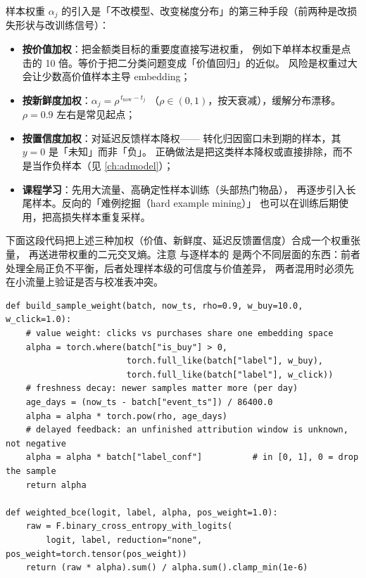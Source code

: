 样本权重 $\alpha_j$ 的引入是「不改模型、改变梯度分布」的第三种手段（前两种是改损失形状与改训练信号）：

\begin{itemize}
  \item \textbf{按价值加权}：把金额类目标的重要度直接写进权重，
        例如下单样本权重是点击的 10 倍。等价于把二分类问题变成「价值回归」的近似。
        风险是权重过大会让少数高价值样本主导 embedding；
  \item \textbf{按新鲜度加权}：$\alpha_j = \rho^{\,t_{\text{now}} - t_j}$
        （$\rho \in (0,1)$，按天衰减），缓解分布漂移。$\rho = 0.9$ 左右是常见起点；
  \item \textbf{按置信度加权}：对延迟反馈样本降权——
        转化归因窗口未到期的样本，其 $y=0$ 是「未知」而非「负」。
        正确做法是把这类样本降权或直接排除，而不是当作负样本（见 \cref{ch:admodel}）；
  \item \textbf{课程学习}：先用大流量、高确定性样本训练（头部热门物品），
        再逐步引入长尾样本。反向的「难例挖掘（hard example mining）」
        也可以在训练后期使用，把高损失样本重复采样。
\end{itemize}

下面这段代码把上述三种加权（价值、新鲜度、延迟反馈置信度）合成一个权重张量，
再送进带权重的二元交叉熵。注意  与逐样本的 
是两个不同层面的东西：前者处理全局正负不平衡，后者处理样本级的可信度与价值差异，
两者混用时必须先在小流量上验证是否与校准表冲突。

\begin{lstlisting}[style=growthnoline, language=PyTorch, caption={精排训练的样本加权（示范实现）}]
def build_sample_weight(batch, now_ts, rho=0.9, w_buy=10.0, w_click=1.0):
    # value weight: clicks vs purchases share one embedding space
    alpha = torch.where(batch["is_buy"] > 0,
                        torch.full_like(batch["label"], w_buy),
                        torch.full_like(batch["label"], w_click))
    # freshness decay: newer samples matter more (per day)
    age_days = (now_ts - batch["event_ts"]) / 86400.0
    alpha = alpha * torch.pow(rho, age_days)
    # delayed feedback: an unfinished attribution window is unknown, not negative
    alpha = alpha * batch["label_conf"]          # in [0, 1], 0 = drop the sample
    return alpha

def weighted_bce(logit, label, alpha, pos_weight=1.0):
    raw = F.binary_cross_entropy_with_logits(
        logit, label, reduction="none", pos_weight=torch.tensor(pos_weight))
    return (raw * alpha).sum() / alpha.sum().clamp_min(1e-6)
\end{lstlisting}

